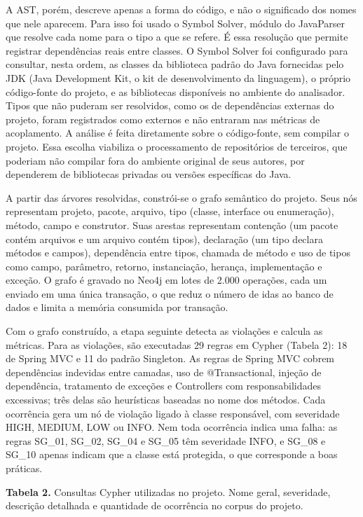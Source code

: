 \documentclass[
  a4paper,
]{article}
\begin{document}
A AST, porém, descreve apenas a forma do código, e não o significado dos nomes que nele aparecem. Para isso foi usado o Symbol Solver, módulo do JavaParser que resolve cada nome para o tipo a que se refere. É essa resolução que permite registrar dependências reais entre classes. O Symbol Solver foi configurado para consultar, nesta ordem, as classes da biblioteca padrão do Java fornecidas pelo JDK (Java Development Kit, o kit de desenvolvimento da linguagem), o próprio código-fonte do projeto, e as bibliotecas disponíveis no ambiente do analisador. Tipos que não puderam ser resolvidos, como os de dependências externas do projeto, foram registrados como externos e não entraram nas métricas de acoplamento. A análise é feita diretamente sobre o código-fonte, sem compilar o projeto. Essa escolha viabiliza o processamento de repositórios de terceiros, que poderiam não compilar fora do ambiente original de seus autores, por dependerem de bibliotecas privadas ou versões específicas do Java.

A partir das árvores resolvidas, constrói-se o grafo semântico do projeto. Seus nós representam projeto, pacote, arquivo, tipo (classe, interface ou enumeração), método, campo e construtor. Suas arestas representam contenção (um pacote contém arquivos e um arquivo contém tipos), declaração (um tipo declara métodos e campos), dependência entre tipos, chamada de método e uso de tipos como campo, parâmetro, retorno, instanciação, herança, implementação e exceção. O grafo é gravado no Neo4j em lotes de 2.000 operações, cada um enviado em uma única transação, o que reduz o número de idas ao banco de dados e limita a memória consumida por transação.

Com o grafo construído, a etapa seguinte detecta as violações e calcula as métricas. Para as violações, são executadas 29 regras em Cypher (Tabela 2): 18 de Spring MVC e 11 do padrão Singleton. As regras de Spring MVC cobrem dependências indevidas entre camadas, uso de @Transactional, injeção de dependência, tratamento de exceções e Controllers com responsabilidades excessivas; três delas são heurísticas baseadas no nome dos métodos. Cada ocorrência gera um nó de violação ligado à classe responsável, com severidade HIGH, MEDIUM, LOW ou INFO. Nem toda ocorrência indica uma falha: as regras SG\_01, SG\_02, SG\_04 e SG\_05 têm severidade INFO, e SG\_08 e SG\_10 apenas indicam que a classe está protegida, o que corresponde a boas práticas.

\textbf{Tabela 2.} Consultas Cypher utilizadas no projeto. Nome geral, severidade, descrição detalhada e quantidade de ocorrência no corpus do projeto.
\end{document}
